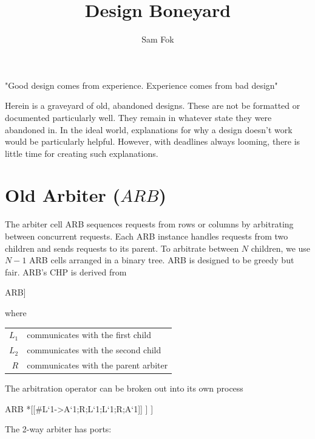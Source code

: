 \documentclass{article}
\begin{document}
\title{Design Boneyard}
\author{Sam Fok}

\maketitle

\begin{displayquote}
"Good design comes from experience.
Experience comes from bad design"
\end{displayquote}

Herein is a graveyard of old, abandoned designs. These are not be formatted or documented particularly well. They remain in whatever state they were abandoned in. In the ideal world, explanations for why a design doesn't work would be particularly helpful. However, with deadlines always looming, there is little time for creating such explanations.

\section{Old Arbiter ($ARB$)}

The arbiter cell ARB sequences requests from rows or columns by arbitrating between concurrent requests. 
Each ARB instance handles requests from two children and sends requests to its parent. 
To arbitrate between $N$ children, we use $N-1$ ARB cells arranged in a binary tree.
ARB is designed to be greedy but fair.
ARB's CHP is derived from

\begin{csp}
ARB\equiv*[[#{L`1}->R;L`1;L`1;R
          \|#{L`2}->R;L`2;L`2;R]]
\end{csp}

where

\begin{tabular}[c]{rl}
$L_1$ & communicates with the first child \\
$L_2$ & communicates with the second child \\
$R$ & communicates with the parent arbiter \\
\end{tabular}

The arbitration operator can be broken out into its own process

\begin{csp}
ARB\equiv\! *[[#{L`1}->A`1;R;L`1;L`1;R;A`1]]
      \pll*[[#{L`2}->A`2;R;L`2;L`2;R;A`2]]
      \pll*[[#{A`1}->A`1;A`1\|#{A`2}->A`2;A2]]
\end{csp}

The 2-way arbiter has ports:
\end{document}
